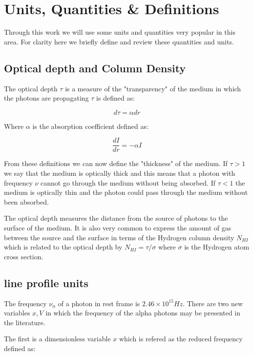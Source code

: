 \section{Units, Quantities \& Definitions}

Through this work we will use some units and quantities very popular in 
this area. For clarity here we briefly define and review these
quantities and units.

\subsection{Optical depth and Column Density}

The optical depth $\tau$ is a measure of the "transparency" of the medium
in which the photons are propagating $\tau$ is defined as:

\begin{equation}
d\tau = \alpha dr
\end{equation}

Where $\alpha$ is the absorption coefficient defined as:

\begin{equation}
\dfrac{dI}{dr} = -\alpha I
\end{equation}

From these definitions we can now define the "thickness" of the medium.
If $\tau > 1$ we say that the medium is optically thick and this means
that a photon with frequency $\nu$ cannot go through the medium without being
absorbed. If $\tau < 1$ the medium is optically thin and the photon
could pass through the medium without been absorbed.

The optical depth measures the distance from the source
of photons to the surface of the medium. It is also very common 
to express the amount of gas between the \ly source and the surface
in terms of the Hydrogen column density 
$N_{HI}$ which is related to the optical depth by $N_{HI} = \tau/\sigma$
where $\sigma$ is the Hydrogen atom cross section. 

\subsection{\ly line profile units}

The frequency $\nu_{\alpha}$ of a \ly photon in rest frame is
$2.46\times 10^{15}Hz$.
There are two new variables $x, V$ in which the frequency of 
the \ly alpha photons may be presented in the literature.

The first is a dimensionless variable $x$ which is refered as
the reduced frequency defined as:

